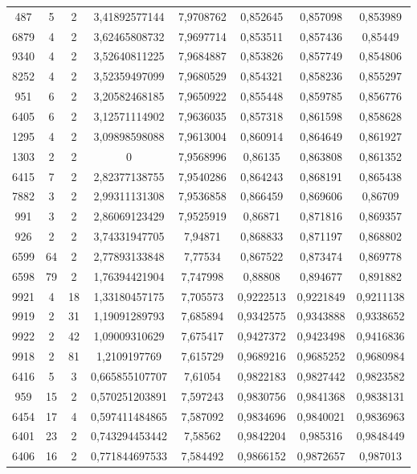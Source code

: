 \begin{longtable}{|c|c|c|c|c|c|c|c|}
487 & 5 & 2 & 3,41892577144 & 7,9708762 & 0,852645 & 0,857098 & 0,853989 \\
6879 & 4 & 2 & 3,62465808732 & 7,9697714 & 0,853511 & 0,857436 & 0,85449 \\
9340 & 4 & 2 & 3,52640811225 & 7,9684887 & 0,853826 & 0,857749 & 0,854806 \\
8252 & 4 & 2 & 3,52359497099 & 7,9680529 & 0,854321 & 0,858236 & 0,855297 \\
951 & 6 & 2 & 3,20582468185 & 7,9650922 & 0,855448 & 0,859785 & 0,856776 \\
6405 & 6 & 2 & 3,12571114902 & 7,9636035 & 0,857318 & 0,861598 & 0,858628 \\
1295 & 4 & 2 & 3,09898598088 & 7,9613004 & 0,860914 & 0,864649 & 0,861927 \\
1303 & 2 & 2 & 0 & 7,9568996 & 0,86135 & 0,863808 & 0,861352 \\
6415 & 7 & 2 & 2,82377138755 & 7,9540286 & 0,864243 & 0,868191 & 0,865438 \\
7882 & 3 & 2 & 2,99311131308 & 7,9536858 & 0,866459 & 0,869606 & 0,86709 \\
991 & 3 & 2 & 2,86069123429 & 7,9525919 & 0,86871 & 0,871816 & 0,869357 \\
926 & 2 & 2 & 3,74331947705 & 7,94871 & 0,868833 & 0,871197 & 0,868802 \\
6599 & 64 & 2 & 2,77893133848 & 7,77534 & 0,867522 & 0,873474 & 0,869778 \\
6598 & 79 & 2 & 1,76394421904 & 7,747998 & 0,88808 & 0,894677 & 0,891882 \\
9921 & 4 & 18 & 1,33180457175 & 7,705573 & 0,9222513 & 0,9221849 & 0,9211138 \\
9919 & 2 & 31 & 1,19091289793 & 7,685894 & 0,9342575 & 0,9343888 & 0,9338652 \\
9922 & 2 & 42 & 1,09009310629 & 7,675417 & 0,9427372 & 0,9423498 & 0,9416836 \\
9918 & 2 & 81 & 1,2109197769 & 7,615729 & 0,9689216 & 0,9685252 & 0,9680984 \\
6416 & 5 & 3 & 0,665855107707 & 7,61054 & 0,9822183 & 0,9827442 & 0,9823582 \\
959 & 15 & 2 & 0,570251203891 & 7,597243 & 0,9830756 & 0,9841368 & 0,9838131 \\
6454 & 17 & 4 & 0,597411484865 & 7,587092 & 0,9834696 & 0,9840021 & 0,9836963 \\
6401 & 23 & 2 & 0,743294453442 & 7,58562 & 0,9842204 & 0,985316 & 0,9848449 \\
6406 & 16 & 2 & 0,771844697533 & 7,584492 & 0,9866152 & 0,9872657 & 0,987013 \\

\end{longtable}
